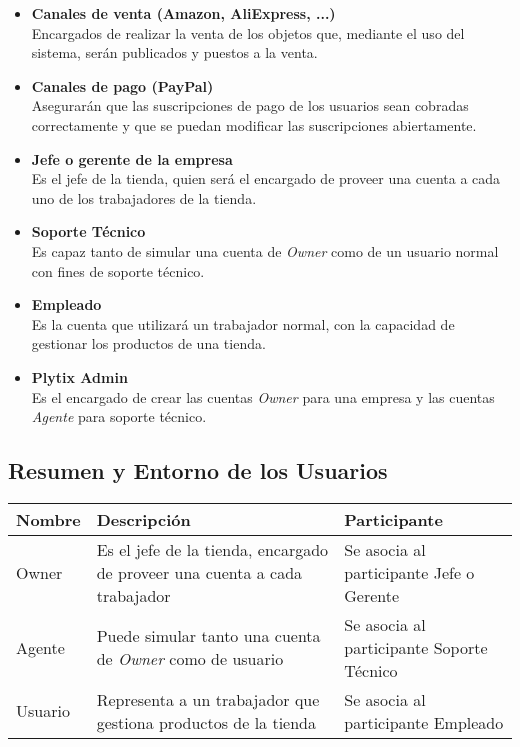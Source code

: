 \documentclass{article}
\begin{document}
\begin{itemize}

    \item \textbf{Canales de venta (Amazon, AliExpress, ...)} \\
        Encargados de realizar la venta de los objetos que, mediante el uso del sistema, serán publicados y puestos a la venta.
    \item \textbf{Canales de pago (PayPal)} \\
        Asegurarán que las suscripciones de pago de los usuarios sean cobradas correctamente y que se puedan modificar las suscripciones abiertamente.
    \item \textbf{Jefe o gerente de la empresa} \\
        Es el jefe de la tienda, quien será el encargado de proveer una cuenta a cada uno de los trabajadores de la tienda.
    \item \textbf{Soporte Técnico} \\
        Es capaz tanto de simular una cuenta de \textit{Owner} como de un usuario normal con fines de soporte técnico.
    \item \textbf{Empleado} \\
        Es la cuenta que utilizará un trabajador normal, con la capacidad de gestionar los productos de una tienda.
    \item \textbf{Plytix Admin} \\
        Es el encargado de crear las cuentas \textit{Owner} para una empresa y las cuentas \textit{Agente} para soporte técnico.
\end{itemize}

\subsection{Resumen y Entorno de los Usuarios}

\begin{tabularx}{\textwidth}{|l|X|l|}
    \hline
    \textbf{Nombre} & \textbf{Descripción} & \textbf{Participante} \\
    \hline
    Owner & Es el jefe de la tienda, encargado de proveer una cuenta a cada trabajador & Se asocia al participante Jefe o Gerente \\
    \hline
    Agente & Puede simular tanto una cuenta de \textit{Owner} como de usuario & Se asocia al participante Soporte Técnico \\
    \hline
    Usuario & Representa a un trabajador que gestiona productos de la tienda & Se asocia al participante Empleado \\
    \hline
\end{tabularx}
\end{document}
